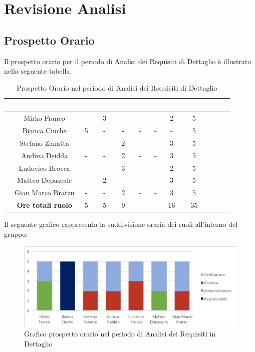 \newpage
\section{Revisione Analisi}
\subsection{Prospetto Orario}
Il prospetto orario per il periodo di Analisi dei Requisiti di Dettaglio è illustrato nella seguente tabella:

\begin{table}[ht]
	\begin{center}
		\begin{tabular}{cccccccccccc}
			\rowcolor{coolblack}
			\hline 
			& \textcolor{white}{Nome} & \textcolor{white}{Re} & \textcolor{white}{Am} & \textcolor{white}{An} & \textcolor{white}{Pt} &\textcolor{white}{Pr} & \textcolor{white}{Ve} & \textcolor{white}{Totale} \\
			\hline
			
			&Mirko Franco          & - & 3 & - & - & - & 2 &5  \\
			&Bianca Ciuche        & 5  & - & - & - & - & - & 5 \\
			&Stefano Zanatta     & -& - & 2 & - & - & 3&5 \\
			&Andrea Deidda       &  -& - & 2 & - & - & 3 &5 \\
			&Ludovico Brocca    & -& -& 3 & - & - & 2 & 5 \\
			&Matteo Depascale  & -& 2& -& - & - & 3 & 5 \\
			&Gian Marco Bratzu & -& - & 2 & - & - & 3& 5 \\
			\hline
			&\textbf{Ore totali ruolo} & 5 & 5 & 9 & - & - & 16 & 35 \\
		\end{tabular}
		\caption{Prospetto Orario nel periodo di Analisi dei Requisiti di Dettaglio}
	\end{center}
\end{table}

Il seguente grafico rappresenta la suddivisione oraria dei ruoli all'interno del gruppo:
\begin{figure}[!ht]
	\begin{center}
		\includegraphics{images/grafoProspettoOrarioDett.png}
		\caption{Grafico prospetto orario nel periodo di Analisi dei Requisiti in Dettaglio}
	\end{center}
\end{figure}
\newpage
